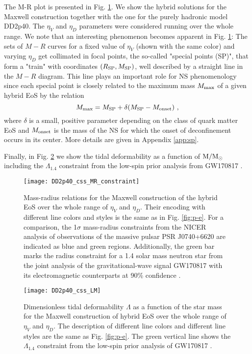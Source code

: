 \documentclass[%
 reprint,
superscriptaddress,
nofootinbib,
 amsmath,amssymb,
 aps,
]{revtex4-1}
\begin{document}
{The M-R plot is presented in Fig. \ref{fig:M-R}. We show
the hybrid solutions for the Maxwell construction together with the one for the purely hadronic model DD2p40. The $\eta_V$ and $\eta_D$ parameters were considered running over the whole range. 
We note that an interesting phenomenon becomes apparent in Fig. \ref{fig:M-R}: 
The sets of $M-R$ curves for a fixed value of $\eta_V$ (shown with the same color) and varying $\eta_D$ get collimated in focal points, the so-called "special points (SP)", that form a "train" with coordinates 
$(R_{\rm SP},M_{\rm SP})$, well described by a straight line in the $M-R$ diagram. 
This line plays an important role for NS phenomenology since each special point is closely related to the maximum mass $M_{\rm max}$ of a given hybrid EoS by the relation  \cite{Blaschke:2020vuy,Ivanytskyi:2022oxv}
\begin{equation}
M_{\rm max}=M_{\rm SP} + \delta (M_{\rm SP} - M_{\rm onset})~,
\end{equation}
where $\delta$ is a small, positive parameter depending on the class of quark matter EoS and $M_{\rm onset}$ is the mass of the NS for which the onset of deconfinement occurs in its center. 
More details are given in Appendix \ref{app:sp}.

Finally, in Fig. \ref{fig:Lambda-M} we show the tidal deformability  as a function of 
$\textmd{M}/\textmd{M}_{\odot}$ including the $\Lambda_{1.4}$ constraint from the low-spin prior analysis from GW170817 \cite{abbott2018gw170817}.}

\begin{figure}[htb]
    \texttt{[image: DD2p40\_css\_MR\_constraint]}
    \caption{Mass-radius relations for the Maxwell construction of the hybrid EoS over the whole range of $\eta_V$ and $\eta_D$. Their encoding with different line colors and styles is the same as in Fig. \ref{fig:p-e}. For a comparison, the
1$\sigma$ mass-radius constraints from the NICER analysis of observations of the massive pulsar PSR J0740+6620 \cite{fonseca2021refined} are indicated as blue \cite{riley2021nicer} and green \cite{miller2021radius} regions. Additionally, the green bar marks the radius constraint for a 1.4 solar mass neutron star from the joint analysis of the gravitational-wave signal
GW170817 with its electromagnetic counterparts at 90\% confidence \cite{dietrich2020multimessenger}.}
    \label{fig:M-R}
\end{figure}

\begin{figure}[htb]
    \texttt{[image: DD2p40\_css\_LM]}
    \caption{Dimensionless tidal deformability $\Lambda$ as a function of the star mass for the Maxwell construction of hybrid EoS over the whole range of $\eta_V$ and $\eta_D$. The description of different line colors and different line styles are the same as Fig. \ref{fig:p-e}. The green vertical line shows the $\Lambda_{1.4}$ constraint from the low-spin prior analysis of GW170817 \cite{abbott2018gw170817}.}
    \label{fig:Lambda-M}
\end{figure}
\end{document}
